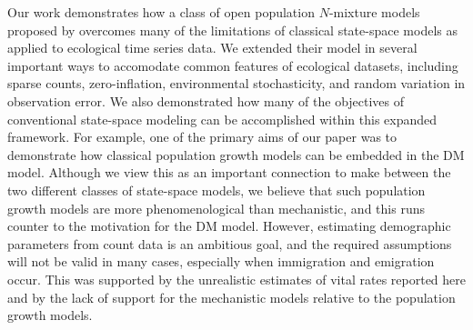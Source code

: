 \documentclass[12pt]{article}
\begin{document}
Our work %
demonstrates how a class of open population $N$-mixture models
proposed by \citet{dail_madsen:2011} overcomes 
many of the limitations of classical state-space models as applied to
ecological time series data.
We extended their model in several important
ways to accomodate common features of ecological
datasets, including sparse counts, zero-inflation, environmental
stochasticity, and random variation in observation error.
We also demonstrated how many of the objectives of conventional
state-space modeling can be accomplished within this expanded
framework. For example, one of the primary aims of our paper was to demonstrate how classical
population growth models can be embedded in the DM model.
Although we view this as an important connection to make between the two
different classes of state-space models, we believe that
such population growth models are more phenomenological
than mechanistic, and this runs counter to the motivation for
the DM model. However, estimating
demographic parameters from count data is an ambitious goal, and
the required assumptions will not be valid in many cases,
especially when immigration and emigration occur. This was supported by the
unrealistic estimates of vital rates reported here and by the
lack of support for the mechanistic models relative to the population
growth models.
\end{document}

